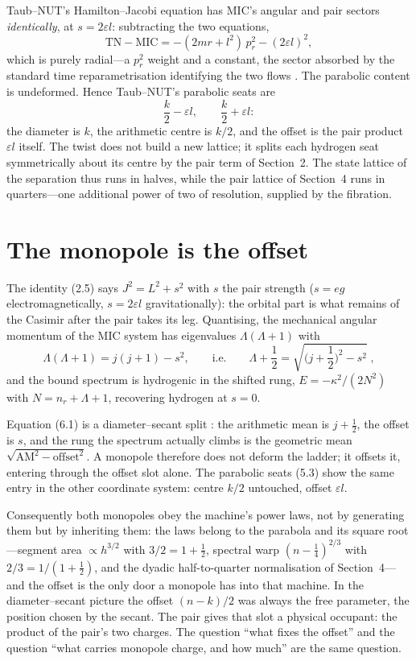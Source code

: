 \documentclass[11pt]{article}
\numberwithin{equation}{section}
\newcommand{\eps}{\varepsilon}
\begin{document}
Taub--NUT's Hamilton--Jacobi equation has MIC's angular and pair sectors
\emph{identically}, at $s=2\eps l$: subtracting the two equations,
\begin{equation}
\mathrm{TN}-\mathrm{MIC}=-(2mr+l^2)\,p_r^2-(2\eps l)^2 ,
\end{equation}
which is purely radial---a $p_r^2$ weight and a constant, the sector
absorbed by the standard time reparametrisation identifying the two flows
\cite{IK}. The parabolic content is undeformed. Hence Taub--NUT's
parabolic seats are
\begin{equation}
\frac{k}{2}-\eps l,\qquad \frac{k}{2}+\eps l :
\end{equation}
the diameter is $k$, the arithmetic centre is $k/2$, and the offset is the
pair product $\eps l$ itself. The twist does not build a new lattice; it
splits each hydrogen seat symmetrically about its centre by the pair term
of Section~2. The state lattice of the separation thus runs in halves,
while the pair lattice of Section~4 runs in quarters---one additional
power of two of resolution, supplied by the fibration.

\section{The monopole is the offset}

The identity (2.5) says $J^2=L^2+s^2$ with $s$ the pair strength ($s=eg$
electromagnetically, $s=2\eps l$ gravitationally): the orbital part is what
remains of the Casimir after the pair takes its leg. Quantising, the
mechanical angular momentum of the MIC system has eigenvalues
$\Lambda(\Lambda+1)$ with \cite{MIC}
\begin{equation}
\Lambda(\Lambda+1)=j(j+1)-s^2,
\qquad\text{i.e.}\qquad
\Lambda+\frac12=\sqrt{\Big(j+\frac12\Big)^2-s^2}\;,
\end{equation}
and the bound spectrum is hydrogenic in the shifted rung,
$E=-\kappa^2/(2N^2)$ with $N=n_r+\Lambda+1$, recovering hydrogen at $s=0$.

Equation (6.1) is a diameter--secant split \cite{EbertSecant}: the
arithmetic mean is $j+\tfrac12$, the offset is $s$, and the rung the
spectrum actually climbs is the geometric mean
$\sqrt{\mathrm{AM}^2-\mathrm{offset}^2}$. A monopole therefore does not
deform the ladder; it offsets it, entering through the offset slot alone.
The parabolic seats (5.3) show the same entry in the other coordinate
system: centre $k/2$ untouched, offset $\eps l$.

Consequently both monopoles obey the machine's power laws, not by
generating them but by inheriting them: the laws belong to the parabola
and its square root---segment area $\propto h^{3/2}$ with
$3/2=1+\tfrac12$, spectral warp $(n-\tfrac14)^{2/3}$ with
$2/3=1/(1+\tfrac12)$, and the dyadic half-to-quarter normalisation of
Section~4---and the offset is the only door a monopole has into that
machine. In the diameter--secant picture the offset $(n-k)/2$ was always
the free parameter, the position chosen by the secant. The pair gives
that slot a physical occupant: the product of the pair's two charges. The
question ``what fixes the offset'' and the question ``what carries
monopole charge, and how much'' are the same question.
\end{document}
